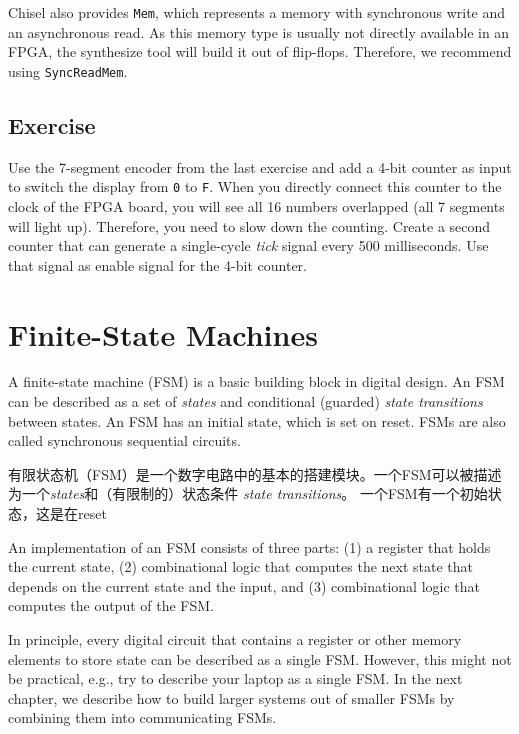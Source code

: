 \documentclass[%
    10pt,
    headinclude, footexclude,
    openright, %
    notitlepage,
    cleardoubleempty,
    headsepline,
    pointlessnumbers,
    bibtotoc, idxtotoc,
    ]{scrbook}
\newcommand{\code}[1]{{\small{\texttt{#1}}}}
\newcommand{\todo}[1]{{\emph{TODO: #1}}}
\renewcommand{\todo}[1]{}
\begin{document}
Chisel also provides \code{Mem}, which represents a memory with synchronous
write and an asynchronous read. As this memory type is usually not directly available
in an FPGA, the synthesize tool will build it out of flip-flops.
Therefore, we recommend using \code{SyncReadMem}.


\section{Exercise}

Use the 7-segment encoder from the last exercise and add a 4-bit counter as input
to switch the display from \code{0} to \code{F}. When you directly connect this
counter to the clock of the FPGA board, you will see all 16 numbers
overlapped (all 7 segments will light up).
Therefore, you need to slow down the counting. Create a second
counter that can generate a single-cycle \emph{tick} signal every 500 milliseconds.
Use that signal as enable signal for the 4-bit counter.

\todo{Luca: More exercises would be nice. Maybe in the future?}

\chapter{Finite-State Machines}

A finite-state machine (FSM) is a basic building block in digital design.
An FSM can be described as a set of \emph{states} and conditional (guarded)
\emph{state transitions} between states. 
An FSM has an initial state, which is set on reset.
FSMs are also called synchronous sequential circuits.

有限状态机（FSM）是一个数字电路中的基本的搭建模块。一个FSM可以被描述为一个\emph{states}和（有限制的）状态条件
\emph{state transitions}。
一个FSM有一个初始状态，这是在reset


An implementation of an FSM consists of three parts: (1) a register that holds the current state,
(2) combinational logic that computes the next state that depends on the current
state and the input, and (3) combinational logic that computes the output of the FSM.

In principle, every digital circuit that contains a register or other memory elements
to store state can be described as a single FSM. However, this might
not be practical, e.g., try to describe your laptop as a single FSM.
In the next chapter, we describe how to build larger systems
out of smaller FSMs by combining them into communicating FSMs.
\end{document}
